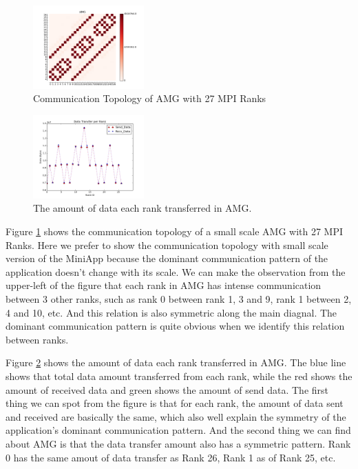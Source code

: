 \documentclass[conference]{IEEEtran}
\begin{document}
\begin{figure}[h!] 
  \centering
  \includegraphics[width=0.38\textwidth]{figs/appstudy/amg/amg_ct}
   \caption{Communication Topology of AMG with 27 MPI Ranks }
   \label{fig: amg communication topology}
\end{figure}

\begin{figure}[h!] 
  \centering
  \includegraphics[width=0.38\textwidth]{figs/appstudy/amg/amg_data_transfer}
   \caption{The amount of data each rank transferred in AMG. }
   \label{fig: amg data trans}
\end{figure}

Figure \ref{fig: amg communication topology} shows the communication topology of a small scale AMG with 27 MPI Ranks. Here we prefer to show the communication topology with small scale version of the MiniApp because the dominant communication pattern of the application doesn't change with its scale. We can make the observation from the upper-left of the figure that each rank in AMG has intense communication between 3 other ranks, such as rank 0 between rank 1, 3 and 9, rank 1 between 2, 4 and 10, etc. And this relation is also symmetric along the main diagnal. The dominant communication pattern is quite obvious when we identify this relation between ranks.

Figure \ref{fig: amg data trans} shows the amount of data each rank transferred in AMG. The blue line shows that total data amount transferred from each rank, while the red shows the amount of received data and green shows the amount of send data. The first thing we can spot from the figure is that for each rank, the amount of data sent and received are basically the same, which also well explain the symmetry of the application's dominant communication pattern. And the second thing we can find about AMG is that the data transfer amount also has a symmetric pattern. Rank 0 has the same amout of data transfer as Rank 26, Rank 1 as of Rank 25, etc.
\end{document}
